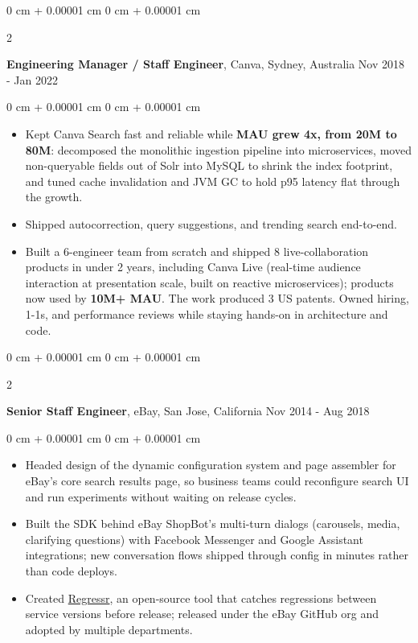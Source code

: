 \documentclass[10pt, letterpaper]{article}
\newenvironment{highlights}{
    \begin{itemize}[
        topsep=0.10 cm,
        parsep=0.10 cm,
        partopsep=0pt,
        itemsep=0pt,
        leftmargin=0 cm + 10pt
    ]
}{
    \end{itemize}
} %
\newenvironment{onecolentry}{
    \begin{adjustwidth}{
        0 cm + 0.00001 cm
    }{
        0 cm + 0.00001 cm
    }
}{
    \end{adjustwidth}
} %
\newenvironment{twocolentry}[2][]{
    \onecolentry
    \def\secondColumn{#2}
    \setcolumnwidth{\fill, 4.5 cm}
    \begin{paracol}{2}
}{
    \switchcolumn \raggedleft \secondColumn
    \end{paracol}
    \endonecolentry
} %
\let\hrefWithoutArrow\href
\begin{document}
        \vspace{0.15 cm}

        \begin{twocolentry}{
            Nov 2018 - Jan 2022
        }
            \textbf{Engineering Manager / Staff Engineer}, Canva, Sydney, Australia\end{twocolentry}

        \vspace{0.10 cm}
        \begin{onecolentry}
            \begin{highlights}
                \item Kept Canva Search fast and reliable while \textbf{MAU grew 4x, from 20M to 80M}: decomposed the monolithic ingestion pipeline into microservices, moved non-queryable fields out of Solr into MySQL to shrink the index footprint, and tuned cache invalidation and JVM GC to hold p95 latency flat through the growth.
                \item Shipped autocorrection, query suggestions, and trending search end-to-end.
                \item Built a 6-engineer team from scratch and shipped 8 live-collaboration products in under 2 years, including Canva Live (real-time audience interaction at presentation scale, built on reactive microservices); products now used by \textbf{10M+ MAU}. The work produced 3 US patents. Owned hiring, 1-1s, and performance reviews while staying hands-on in architecture and code.
            \end{highlights}
        \end{onecolentry}

        \vspace{0.15 cm}
        \begin{twocolentry}{
            Nov 2014 - Aug 2018
        }
            \textbf{Senior Staff Engineer}, eBay, San Jose, California\end{twocolentry}
        \vspace{0.10 cm}
        \begin{onecolentry}
            \begin{highlights}
                \item Headed design of the dynamic configuration system and page assembler for eBay's core search results page, so business teams could reconfigure search UI and run experiments without waiting on release cycles.
                \item Built the SDK behind eBay ShopBot's multi-turn dialogs (carousels, media, clarifying questions) with Facebook Messenger and Google Assistant integrations; new conversation flows shipped through config in minutes rather than code deploys.
                \item Created \hrefWithoutArrow{https://github.com/eBay/regressr}{Regressr}, an open-source tool that catches regressions between service versions before release; released under the eBay GitHub org and adopted by multiple departments.
            \end{highlights}
        \end{onecolentry}
\end{document}
